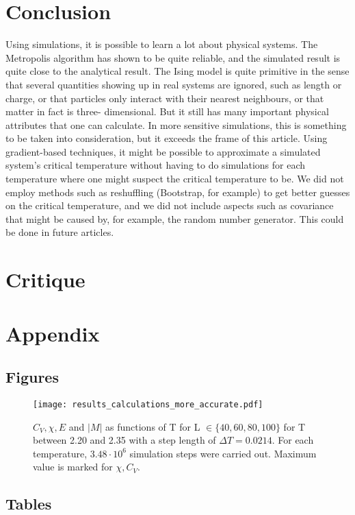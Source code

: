 \documentclass[10pt,a4paper]{article}
\begin{document}
\section{Conclusion}
Using simulations, it is possible to learn a lot about physical systems. The Metropolis algorithm has shown to be quite reliable, and the simulated result is quite close to the analytical result. The Ising model is quite primitive in the sense that several quantities showing up in real systems are ignored, such as length or charge, or that particles only interact with their nearest neighbours, or that matter in fact is three- dimensional. But it still has many important physical attributes that one can calculate. In more sensitive simulations, this is something to be taken into consideration, but it exceeds the frame of this article. Using gradient-based techniques, it might be possible to approximate a simulated system's critical temperature without having to do simulations for each temperature where one might suspect the critical temperature to be. 
We did not employ methods such as reshuffling (Bootstrap, for example) to get better guesses on the critical temperature, and we did not include aspects such as covariance that might be caused by, for example, the random number generator. This could be done in future articles.
\section{Critique}

\section{Appendix}
\subsection{Figures}
\begin{figure}[H]
\texttt{[image: results\_calculations\_more\_accurate.pdf]}
\caption[$C_V,\chi,E, |M|$ for T between 2.20 and 2.35]{$C_V,\chi,E$ and $|M|$ as functions of T for  L $ \in \{40,60,80,100\}$ for T between 2.20 and 2.35 with a step length of $\Delta T=0.0214$. For each temperature, $3.48\cdot10^6$ simulation steps were carried out. Maximum value is marked for $\chi,C_V$.}\label{for T between 2.20 and 2.35}
\end{figure}

\subsection{Tables}
\end{document}
